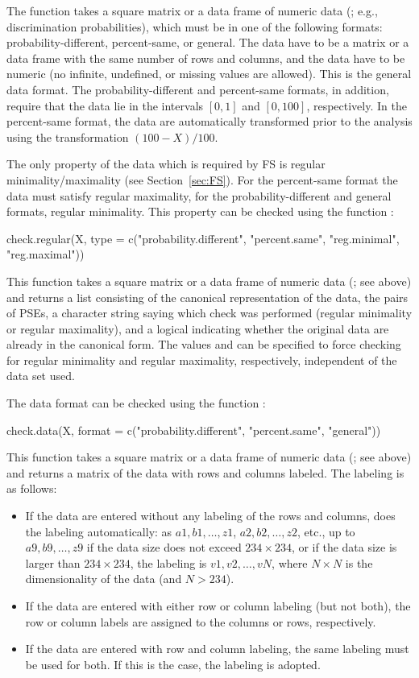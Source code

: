 \documentclass[nojss]{jss}
\begin{document}
The function  takes a square matrix or a data frame of numeric data (; e.g., discrimination probabilities), 
which must be in one of the following formats: probability-different, percent-same, or general. 
The data have to be a matrix or a data frame with the same number of rows and columns, and the data have to be numeric 
(no infinite, undefined, or missing values are allowed). This is the general data format. 
The probability-different and percent-same formats, in addition, require that the data lie in the intervals $[0, 1]$ and $[0, 100]$, respectively. 
In the percent-same format, the data are automatically transformed prior to the analysis using the transformation $(100 - X) / 100$. 

The only property of the data which is required by FS is regular minimality/maximality (see Section~\ref{sec:FS}). 
For the percent-same format the data must satisfy regular maximality, for the probability-different and general formats, regular minimality. 
This property can be checked using the function :
\begin{Code}
check.regular(X, type = c("probability.different", "percent.same",
  "reg.minimal", "reg.maximal"))
\end{Code}
This function takes a square matrix or a data frame of numeric data (; see  above) and returns a list consisting 
of the canonical representation of the data, 
the pairs of PSEs, a character string saying which check was performed (regular minimality or regular maximality),
and a logical indicating whether the original data are already in the canonical form. The values  and  can be specified 
to force checking for regular minimality and regular maximality, respectively, independent of the data set used.

The data format can be checked using the function :
\begin{Code}
check.data(X, format = c("probability.different", "percent.same", "general"))
\end{Code}
This function takes a square matrix or a data frame of numeric data (; see  above) 
and returns a matrix of the data with rows and columns labeled. The labeling is as follows:
\begin{itemize}
\item If the data are entered without any labeling of the rows and columns,  does the labeling automatically: as
$a1, b1, \ldots, z1$, $a2, b2, \ldots, z2$, etc., up to $a9, b9, \ldots, z9$ 
if the data size does not exceed $234\times 234$, or if the data size is larger than $234\times 234$, 
the labeling is $v1, v2, \ldots, vN$, where $N\times N$ is the dimensionality of the data 
(and $N > 234$).
\item If the data are entered with either row or column labeling (but not both), the row or column labels are assigned
to the columns or rows, respectively.
\item If the data are entered with row and column labeling, the same labeling must be used for both. If this is the
case, the labeling is adopted. 
\end{itemize}
\end{document}
